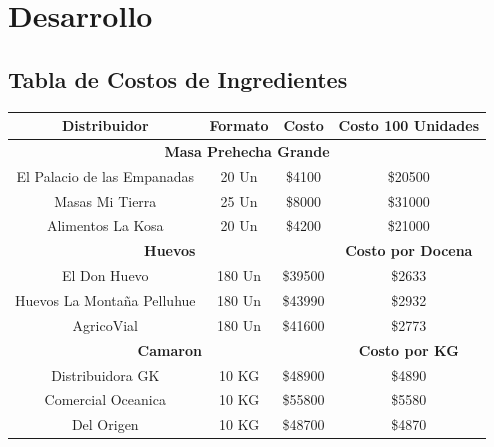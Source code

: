 \documentclass[12pt]{article}
\begin{document}
\newpage



\section{Desarrollo} %

\subsection{Tabla de Costos de Ingredientes}

\begin{table}[H] %
    \centering
    \begin{tabular}{|| c | c | c | c||} 
        \hline
    \textbf{Distribuidor} & Formato & \textbf{Costo} & \textbf{Costo 100 Unidades} \\ [0.5ex]
        \hline\hline
        \multicolumn{4}{||c||}{\textbf{Masa Prehecha Grande}} \\ [0.5ex] \hline \hline
        El Palacio de las Empanadas & 20 Un & \$4100 & \$20500 \\ \hline
        Masas Mi Tierra & 25 Un & \$8000 & \$31000 \\ \hline
        Alimentos La Kosa & 20 Un & \$4200 & \$21000 \\ [1ex] \hline \hline

        \multicolumn{3}{||c||}{\textbf{Huevos}} & \textbf{Costo por Docena} \\ [0.5ex] \hline \hline
        El Don Huevo & 180 Un & \$39500 & \$2633 \\ \hline
        Huevos La Montaña Pelluhue & 180 Un & \$43990 & \$2932 \\ \hline
        AgricoVial & 180 Un & \$41600 & \$2773 \\ [1ex] \hline \hline

        \multicolumn{3}{||c|}{\textbf{Camaron}} & \textbf{Costo por KG} \\ [0.5ex] \hline \hline
        Distribuidora GK & 10 KG & \$48900 & \$4890 \\ \hline
        Comercial Oceanica & 10 KG & \$55800 & \$5580 \\ \hline
        Del Origen & 10 KG & \$48700 & \$4870 \\ [1ex] \hline \hline


\end{tabular}
\end{table}
\end{document}
